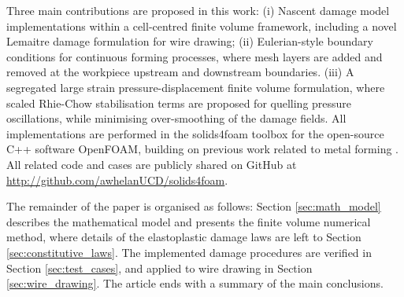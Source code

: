 \documentclass[sn-mathphys,Numbered]{sn-jnl}%
\begin{document}
Three main contributions are proposed in this work:
(i) Nascent damage model implementations within a cell-centred finite volume framework, including a novel Lemaitre damage formulation for wire drawing;
(ii) Eulerian-style boundary conditions for continuous forming processes, where mesh layers are added and removed at the workpiece upstream and downstream boundaries.
(iii) A segregated large strain pressure-displacement finite volume formulation, where scaled Rhie-Chow stabilisation terms are proposed for quelling pressure oscillations, while minimising over-smoothing of the damage fields.
All implementations are performed in the solids4foam toolbox \cite{Cardiff2018, Tukovic2018} for the open-source C++ software OpenFOAM, building on previous work related to metal forming \cite{cardiff_lagrangian_2017, clancy_improving_2019}.
All related code and cases are publicly shared on GitHub at \url{http://github.com/awhelanUCD/solids4foam}.


The remainder of the paper is organised as follows:
Section \ref{sec:math_model} describes the mathematical model and presents the finite volume numerical method, where details of the elastoplastic damage laws are left to Section \ref{sec:constitutive_laws}.
The implemented damage procedures are verified in Section \ref{sec:test_cases}, and applied to wire drawing in Section \ref{sec:wire_drawing}.
The article ends with a summary of the main conclusions.
\end{document}
